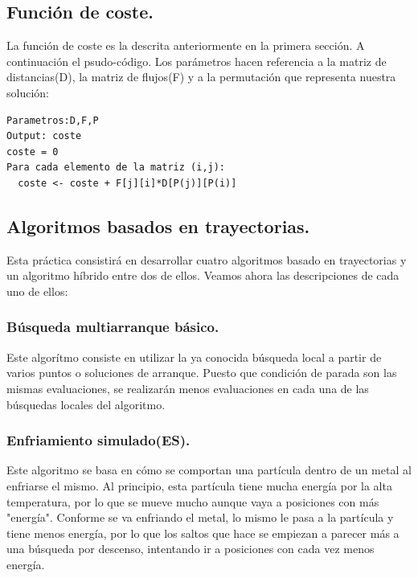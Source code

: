 \subsection{Función de coste.}

La función de coste es la descrita anteriormente en la primera sección. A continuación el psudo-código. Los parámetros hacen referencia a la matriz de distancias(D), la matriz de flujos(F) y a la permutación que representa nuestra solución:\\

\begin{lstlisting}
Parametros:D,F,P
Output: coste
coste = 0
Para cada elemento de la matriz (i,j):
  coste <- coste + F[j][i]*D[P(j)][P(i)]
\end{lstlisting}


\subsection{Algoritmos basados en trayectorias.}

Esta práctica consistirá en desarrollar cuatro algoritmos basado en trayectorias y un algoritmo híbrido entre dos de ellos. Veamos ahora las descripciones de cada uno de ellos:\\

\subsubsection{Búsqueda multiarranque básico.}

Este algorítmo consiste en utilizar la ya conocida búsqueda local a partir de varios puntos o soluciones de arranque. Puesto que  condición de parada son las mismas evaluaciones, se realizarán menos evaluaciones en cada una de las búsquedas locales del algoritmo.

\subsubsection{Enfriamiento simulado(ES).}

Este algoritmo se basa en cómo  se comportan una partícula dentro de un metal al enfriarse el mismo. Al principio, esta partícula tiene mucha energía por la alta temperatura, por lo que se mueve mucho aunque vaya a posiciones con más "energía". Conforme se va enfriando el metal, lo mismo le pasa a la partícula y tiene menos energía, por lo que los saltos que hace se empiezan a parecer más a una búsqueda por descenso, intentando ir a posiciones con cada vez menos energía. 

